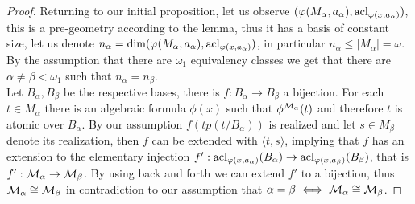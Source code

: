 \begin{proof}
	Returning to our initial proposition, let us observe $(\varphi(M_{\alpha}, a_{\alpha}), \operatorname{acl}_{\varphi(x, a_{\alpha})})$, this is a pre-geometry according to the lemma,
	thus it has a basis of constant size, let us denote $n_{\alpha} = \dim (\varphi(M_{\alpha}, a_{\alpha}), \operatorname{acl}_{\varphi(x, a_{\alpha})})$, in particular $n_{\alpha} \le |M_{\alpha}| = \omega$.
	By the assumption that there are $\omega_1$ equivalency classes we get that there are $\alpha \ne \beta < \omega_1$ such that $n_{\alpha} = n_{\beta}$. \\
	Let $B_{\alpha}, B_{\beta}$ be the respective bases, there is $f : B_{\alpha} \to B_{\beta}$ a bijection.
	For each $t \in M_{\alpha}$ there is an algebraic formula $\phi(x)$ such that $\phi^{\mathcal{M}_{\alpha}}(t)$ and therefore $t$ is atomic over $B_{\alpha}$.
	By our assumption $f(tp(t / B_{\alpha}))$ is realized and let $s \in M_{\beta}$ denote its realization, then $f$ can be extended with $\langle t, s \rangle$,
	implying that $f$ has an extension to the elementary injection $f' : \operatorname{acl}_{\varphi(x, a_{\alpha})}(B_{\alpha}) \to \operatorname{acl}_{\varphi(x, a_{\beta})}(B_{\beta})$, that is $f' : \mathcal{M}_{\alpha} \to \mathcal{M}_{\beta}$.
	By using back and forth we can extend $f'$ to a bijection, thus $\mathcal{M}_{\alpha} \cong \mathcal{M}_{\beta}$ in contradiction to our assumption that $\alpha = \beta \iff \mathcal{M}_{\alpha} \cong \mathcal{M}_{\beta}$.
\end{proof}


